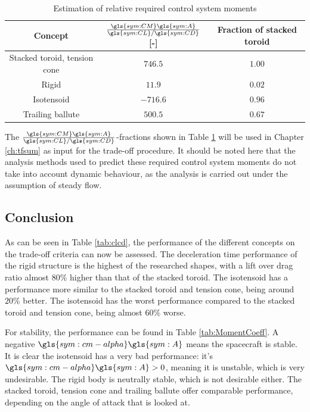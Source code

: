 \begin{table}[h]
	\centering
	\caption{Estimation of relative required control system moments}
	\begin{tabular}{|c|c|c|}

		\hline
		\textbf{Concept} & $\frac{\gls{sym:CM}\gls{sym:A}}{\gls{sym:CL}/\gls{sym:CD}}$ [-] & \textbf{Fraction of stacked toroid} \\ \hline \hline

		Stacked toroid, tension cone & $746.5$ & $1.00$\\
		Rigid & $11.9$ & $0.02$ \\
		Isotensoid & $-716.6$ & $0.96$\\
		Trailing ballute & $500.5$ & $0.67$\\
		\hline
	\end{tabular}
	\label{tab:controlmass}
\end{table}

The $\frac{\gls{sym:CM}\gls{sym:A}}{\gls{sym:CL}/\gls{sym:CD}}$-fractions shown in Table \ref{tab:controlmass} will be used in Chapter \ref{ch:tfsum} as input for the trade-off procedure. It should be noted here that the analysis methods used to predict these required control system moments do not take into account dynamic behaviour, as the analysis is carried out under the assumption of steady flow.

\subsection{Conclusion}
As can be seen in Table \ref{tab:clcd}, the performance of the different concepts on the trade-off criteria can now be assessed. The deceleration time performance of the rigid structure is the highest of the researched shapes, with a lift over drag ratio almost $80\%$ higher than that of the stacked toroid. The isotensoid has a performance more similar to the stacked toroid and tension cone, being around $20\%$ better. The isotensoid has the worst performance compared to the stacked toroid and tension cone, being almost $60\%$ worse.

For stability, the performance can be found in Table \ref{tab:MomentCoeff}. A negative $\gls{sym:cm-alpha}\gls{sym:A}$ means the spacecraft is stable. It is clear the isotensoid has a very bad performance: it's $\gls{sym:cm-alpha}\gls{sym:A}>0$, meaning it is unstable, which is very undesirable. The rigid body is neutrally stable, which is not desirable either. The stacked toroid, tension cone and trailing ballute offer comparable performance, depending on the angle of attack that is looked at.

